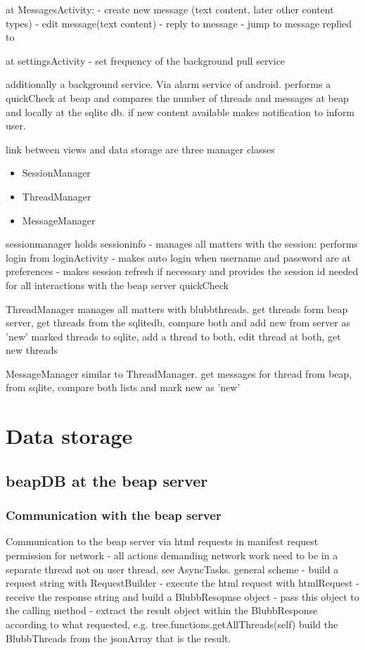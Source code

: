 \documentclass[12pt,a4paper,oneside]{report}
\begin{document}
at MessagesActivity:
- create new message (text content, later other content types)
- edit message(text content)
- reply to message
- jump to message replied to

at settingsActivity
- set frequency of the background pull service

additionally a background service. Via alarm service of android.
performs a quickCheck at beap and compares the number of threads and messages at beap and locally at the sqlite db. if new content available makes notification to inform user.

link between views and data storage are three manager classes
\begin{itemize}
\item{SessionManager}
\item{ThreadManager}
\item{MessageManager}
\end{itemize}

sessionmanager holds sessioninfo - manages all matters with the session: performs login from loginActivity - makes auto login when username and password are at preferences - makes session refresh if necessary and provides the session id needed for all interactions with the beap server quickCheck 

ThreadManager manages all matters with blubbthreads. get threads form beap server, get threads from the sqlitedb, compare both and add new from server as 'new' marked threads to sqlite, add a thread to both, edit thread at both, get new threads

MessageManager similar to ThreadManager. get messages for thread from beap, from sqlite, compare both lists and mark new as 'new' 



\section{Data storage}

\subsection{beapDB at the beap server}

\subsubsection{Communication with the beap server}
Communication to the beap server via html requests 
in manifest request permission for network - all actions demanding network work need to be in a separate thread not on user thread, see AsyncTasks.
general scheme
	- build a request string with RequestBuilder
	- execute the html request with htmlRequest
	- receive the response string and build a BlubbResopnse object
	- pass this object to the calling method
	- extract the result object within the BlubbResponse according to what requested, e.g. tree.functions.getAllThreads(self) build the BlubbThreads from the jsonArray that is the result.
	
\end{document}
